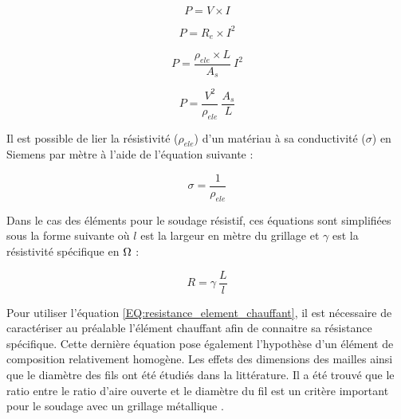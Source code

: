 \begin{equation}
P = V \times I
\end{equation}

\begin{equation}
P = R_e \times I^2
\end{equation}

\begin{equation}
P = \frac{\rho_{ele} \times L}{A_s} \ I^2
\end{equation}

\begin{equation}
P = \frac{V^2}{\rho_{ele}} \ \frac{A_s}{L}
\end{equation}

Il est possible de lier la résistivité ($\rho_{ele}$) d'un matériau à sa conductivité ($\sigma$) en Siemens par mètre à l'aide de l'équation suivante :

\begin{equation}
\sigma = \frac{1}{\rho_{ele}}
\end{equation}

Dans le cas des éléments pour le soudage résistif, ces équations sont simplifiées sous la forme suivante où $l$ est la largeur en mètre du grillage et $\gamma$ est la résistivité spécifique en $\ohm$ :

\begin{equation}
R = \gamma \ \frac{L}{l}
\label{EQ:resistance_element_chauffant}
\end{equation}

Pour utiliser l'équation \ref{EQ:resistance_element_chauffant}, il est nécessaire de caractériser au préalable l'élément chauffant afin de connaitre sa résistance spécifique. 
Cette dernière équation pose également l'hypothèse d'un élément de composition relativement homogène. 
Les effets des dimensions des mailles ainsi que le diamètre des fils ont été étudiés dans la littérature.
Il a été trouvé que le ratio entre le ratio d'aire ouverte et le diamètre du fil est un critère important pour le soudage avec un grillage métallique \cite{Dube2012a}. 

